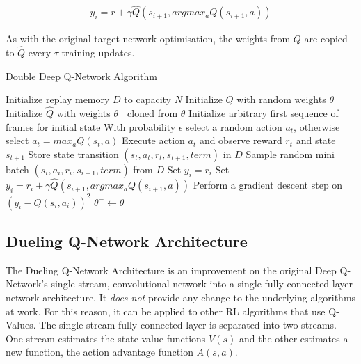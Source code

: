 \begin{align}
    \label{equ:DubTarget}
    y_i = r + \gamma \hat{Q}(s_{i+1}, argmax_aQ(s_{i+1}, a))
\end{align}

As with the original target network optimisation, the weights from $Q$ are copied to $\hat{Q}$
every $\tau$ training updates.

\begin{algorithm}
    \caption{Double Deep Q-Network Algorithm} \label{alg:DDQN}
    \begin{algorithmic}[1]
        \State Initialize replay memory $D$ to capacity $N$
        \State Initialize $Q$ with random weights $\theta$
        \State Initialize $\hat{Q}$ with weights $\theta^-$ cloned from $\theta$
        \State Initialize arbitrary first sequence of frames for initial state
        \State With probability $\epsilon$ select a random action $a_t$, otherwise select $a_t = max_a Q(s_t, a)$
        \State Execute action $a_t$ and observe reward $r_t$ and state $s_{t+1}$
        \State Store state transition $(s_t, a_t, r_t, s_{t+1}, term)$ in $D$
        \State Sample random mini batch $(s_i, a_i, r_i, s_{i + 1}, term)$ from $D$
        \State Set $y_i = r_i$
        \Else
        \State Set $y_i = r_i + \gamma \hat{Q}(s_{i+1}, argmax_aQ(s_{i+1}, a))$ \label{DDQN:target}
        \EndIf
        \EndFor
        \State Perform a gradient descent step on $(y_i - Q(s_i, a_i))^2$
        $\theta^- \leftarrow \theta$
        \EndIf
        \EndFor
    \end{algorithmic}
\end{algorithm}

\subsection{Dueling Q-Network Architecture}
The Dueling Q-Network Architecture is an improvement on the original Deep Q-Network's single stream, convolutional network into a single fully connected layer network architecture. It \textit{does not} provide any change to the underlying algorithms at work. For this reason, it can be applied to other RL algorithms that use Q-Values. The single stream fully connected layer is separated into two streams. One stream estimates the state value functions $V(s)$ and the other estimates a new function, the action advantage function $A(s, a)$.

